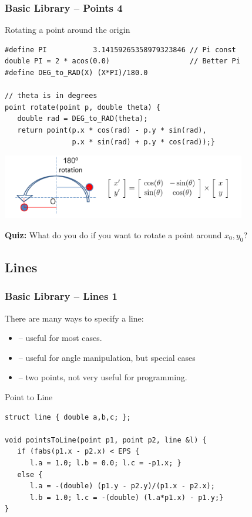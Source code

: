 \documentclass{beamer}
\begin{document}
\begin{frame}[fragile]
  \frametitle{Basic Library -- Points 4}

  {\smaller
              
    \begin{exampleblock}{Rotating a point around the origin}
\begin{verbatim}
#define PI           3.14159265358979323846 // Pi const
double PI = 2 * acos(0.0)                   // Better Pi
#define DEG_to_RAD(X) (X*PI)/180.0

// theta is in degrees
point rotate(point p, double theta) {
   double rad = DEG_to_RAD(theta);
   return point(p.x * cos(rad) - p.y * sin(rad),
                p.x * sin(rad) + p.y * cos(rad));}   
\end{verbatim}
    \end{exampleblock}
    \begin{center}
      \includegraphics[width=0.8\textwidth]{../img/rotation_halim}
    \end{center}

    {\bf Quiz:} What do you do if you want to rotate a point around $x_0, y_0$?
  }
\end{frame}

\subsection{Lines}

\begin{frame}[fragile]
  \frametitle{Basic Library -- Lines 1}

  {\small
  There are many ways to specify a line:

  \begin{itemize}
  \item {} -- useful for most cases.
  \item {} -- useful for angle manipulation, but special cases
  \item {} -- two points, not very useful for programming.
  \end{itemize}

  \begin{exampleblock}{Point to Line}
\begin{verbatim}
struct line { double a,b,c; };

void pointsToLine(point p1, point p2, line &l) {
   if (fabs(p1.x - p2.x) < EPS { 
      l.a = 1.0; l.b = 0.0; l.c = -p1.x; }
   else {
      l.a = -(double) (p1.y - p2.y)/(p1.x - p2.x);
      l.b = 1.0; l.c = -(double) (l.a*p1.x) - p1.y;}
}
\end{verbatim}
  \end{exampleblock}
  }
\end{frame}
\end{document}
